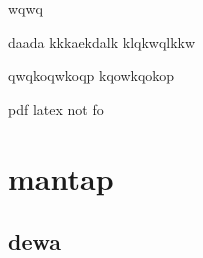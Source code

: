 \documentclass[11pt]{article}
\date{\today}
\title{}
\begin{document}
\tableofcontents

wqwq

daada
kkkaekdalk
klqkwqlkkw

qwqkoqwkoqp
kqowkqokop



pdf latex not fo

\section{mantap}
\label{sec:org4c4e6fe}

\subsection{dewa}
\label{sec:org7e05b03}
\end{document}
